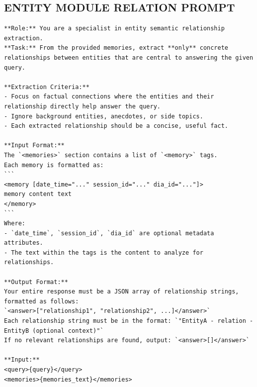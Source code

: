 \subsection{ENTITY MODULE RELATION PROMPT}
\begin{center}
\begin{tcolorbox}[title={ENTITY MODULE RELATION PROMPT (Low)}]
{
\begin{Verbatim}[breaklines, breakanywhere,fontfamily=tt, fontseries=b, baselinestretch=0.95]
**Role:** You are a specialist in entity semantic relationship extraction.  
**Task:** From the provided memories, extract **only** concrete relationships between entities that are central to answering the given query.

**Extraction Criteria:**  
- Focus on factual connections where the entities and their relationship directly help answer the query.  
- Ignore background entities, anecdotes, or side topics.  
- Each extracted relationship should be a concise, useful fact.

**Input Format:**  
The `<memories>` section contains a list of `<memory>` tags.  
Each memory is formatted as:  
```
<memory [date_time="..." session_id="..." dia_id="..."]>
memory content text
</memory>
```  
Where:  
- `date_time`, `session_id`, `dia_id` are optional metadata attributes.  
- The text within the tags is the content to analyze for relationships.

**Output Format:**  
Your entire response must be a JSON array of relationship strings, formatted as follows:  
`<answer>["relationship1", "relationship2", ...]</answer>`  
Each relationship string must be in the format: `"EntityA - relation - EntityB (optional context)"`  
If no relevant relationships are found, output: `<answer>[]</answer>`

**Input:**  
<query>{query}</query>  
<memories>{memories_text}</memories>
\end{Verbatim}
}
\label{appendix:prompt_for_locomo}
\end{tcolorbox}
\end{center}

